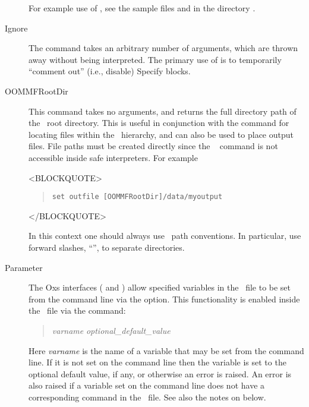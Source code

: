 \begin{description}
For example use of , see the sample files
 and  in the
directory .


\item[Ignore]
The  command takes an arbitrary number of arguments, which
are thrown away without being interpreted.  The primary use of
 is to temporarily ``comment out'' (i.e., disable) Specify
blocks.

\item[OOMMFRootDir]
This command takes no arguments, and returns the full directory path of
the \OOMMF\ root directory.  This is useful in conjunction with the
 command for locating files within the \OOMMF\ hierarchy,
and can also be used to place output files.  File paths must be created
directly since the \Tcl\  command is not accessible inside safe
interpreters.  For example
\begin{rawhtml}
<BLOCKQUOTE>
\end{rawhtml}
\begin{quote}
\begin{verbatim}
set outfile [OOMMFRootDir]/data/myoutput
\end{verbatim}
\end{quote}
\begin{rawhtml}
</BLOCKQUOTE>
\end{rawhtml}
In this context one should always use \Tcl\ path conventions.  In
particular, use forward slashes, ``\fs'', to separate directories.

\item[Parameter]
The Oxs interfaces
( and
)
allow specified variables in the \MIF\ file to be set from the command
line via the  option.  This functionality is enabled
inside the \MIF\ file via the  command:
\begin{quote}
 \textit{varname} \textit{optional\_default\_value}
\end{quote}
Here \textit{varname} is the name of a variable that may be set from
the command line.  If it is not set on the command line then the
variable is set to the optional default value, if any, or otherwise an
error is raised.  An error is also raised if a variable set on the
command line does not have a corresponding  command in the
\MIF\ file.  See also the notes on
 below.


\end{description}
